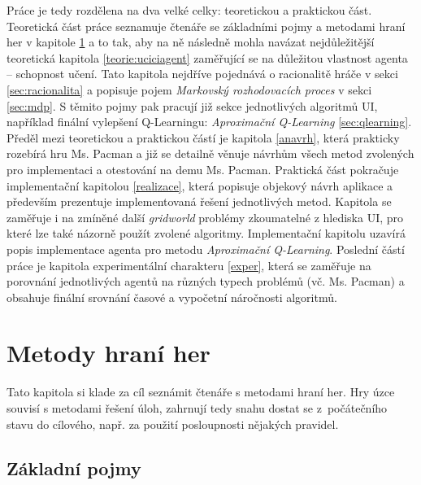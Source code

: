 Práce je tedy rozdělena na dva velké celky: teoretickou a praktickou část. Teoretická část práce seznamuje čtenáře se základními pojmy a metodami hraní her v kapitole \ref{teorie:metodyapojmy} a to tak, aby na ně následně mohla navázat nejdůležitější teoretická kapitola \ref{teorie:uciciagent} zaměřující se na důležitou vlastnost agenta -- schopnost učení. Tato kapitola nejdříve pojednává o racionalitě hráče v sekci \ref{sec:racionalita} a popisuje pojem \textit{Markovský rozhodovacích proces} v sekci \ref{sec:mdp}. S těmito pojmy pak pracují již sekce jednotlivých algoritmů UI, například finální vylepšení Q-Learningu: \textit{Aproximační Q-Learning} \ref{sec:qlearning}. Předěl mezi teoretickou a praktickou částí je kapitola \ref{anavrh}, která prakticky rozebírá hru Ms. Pacman a již se detailně věnuje návrhům všech metod zvolených pro implementaci a otestování na demu Ms. Pacman. Praktická část pokračuje implementační kapitolou \ref{realizace}, která popisuje objekový návrh aplikace a především prezentuje implementovaná řešení jednotlivých metod. Kapitola se zaměřuje i na zmíněné další \textit{gridworld} problémy zkoumatelné z hlediska UI, pro které lze také názorně použít zvolené algoritmy. Implementační kapitolu uzavírá popis implementace agenta pro metodu \textit{Aproximační Q-Learning}. Poslední částí práce je kapitola experimentální charakteru \ref{exper}, která se zaměřuje na porovnání jednotlivých agentů na různých typech problémů (vč. Ms. Pacman) a obsahuje finální srovnání časové a vypočetní náročnosti algoritmů.

\chapter{Metody hraní her}
\label{teorie:metodyapojmy}
Tato kapitola si klade za cíl seznámit čtenáře s metodami hraní her. Hry úzce souvisí s metodami řešení úloh, zahrnují tedy snahu dostat se z počátečního stavu do cílového, např. za použití posloupnosti nějakých pravidel. 

\section{Základní pojmy}

